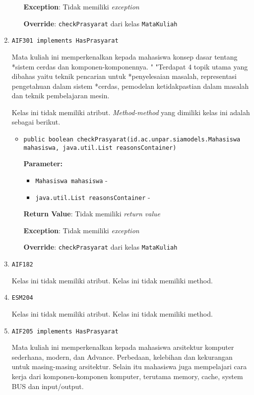\documentclass{article}
\begin{document}
\begin{enumerate}
\begin{itemize}
\textbf{Exception}: Tidak memiliki \textit{exception}

\textbf{Override}: \texttt{checkPrasyarat} dari kelas \texttt{MataKuliah}

\end{itemize}
\item \texttt{AIF301 implements HasPrasyarat}

Mata kuliah ini memperkenalkan kepada mahasiswa konsep dasar tentang *sistem
 cerdas dan komponen-komponennya. " "Terdapat 4 topik utama yang dibahas yaitu
 teknik pencarian untuk *penyelesaian masalah, representasi pengetahuan dalam
 sistem *cerdas, pemodelan ketidakpastian dalam masalah dan teknik
 pembelajaran mesin.

Kelas ini tidak memiliki atribut. \textit{Method-method} yang dimiliki kelas ini adalah sebagai berikut.
\begin{itemize}
\item \texttt{public boolean checkPrasyarat(id.ac.unpar.siamodels.Mahasiswa mahasiswa, java.util.List reasonsContainer)}



\textbf{Parameter:}
\begin{itemize}
\item \texttt{Mahasiswa mahasiswa} - 
\item \texttt{java.util.List reasonsContainer} - 
\end{itemize}
\textbf{Return Value}: Tidak memiliki \textit{return value}

\textbf{Exception}: Tidak memiliki \textit{exception}

\textbf{Override}: \texttt{checkPrasyarat} dari kelas \texttt{MataKuliah}

\end{itemize}
\item \texttt{AIF182}



Kelas ini tidak memiliki atribut. Kelas ini tidak memiliki method. \item \texttt{ESM204}



Kelas ini tidak memiliki atribut. Kelas ini tidak memiliki method. \item \texttt{AIF205 implements HasPrasyarat}

Mata kuliah ini memperkenalkan kepada mahasiswa arsitektur komputer 
 sederhana, modern, dan Advance. Perbedaan, kelebihan dan kekurangan untuk 
 masing-masing arsitektur. Selain itu mahasiswa juga mempelajari cara kerja 
 dari komponen-komponen komputer, terutama memory, cache, system BUS dan 
 input/output.


\end{enumerate}
\end{document}
